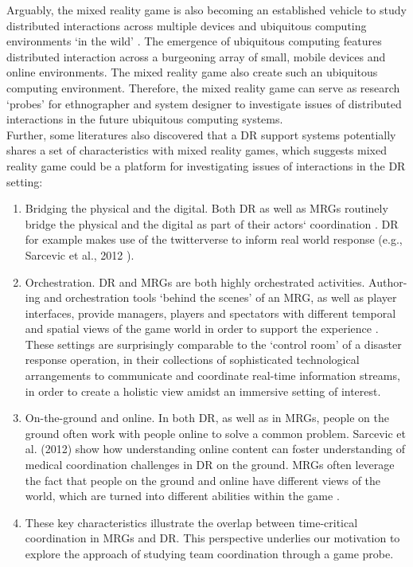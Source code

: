 Arguably, the mixed reality game is also becoming an established vehicle to study distributed interactions across multiple devices and ubiquitous computing environments `in the wild' \cite{Crabtree2006, Benford2005, Fischer2012}. The emergence of ubiquitous computing features distributed interaction across a burgeoning array of small, mobile devices and online environments. The mixed reality game also create such an ubiquitous computing environment. Therefore, the mixed reality game can serve as research `probes' for ethnographer and system designer to investigate issues of distributed interactions in the future ubiquitous computing systems.\\

Further, some literatures \cite{Fischer2012} also discovered that a DR support systems potentially shares a set of characteristics with mixed reality games, which suggests mixed reality game could be a platform for investigating issues of interactions in the DR setting:\\

\begin{enumerate}
\item Bridging the physical and the digital. Both DR as well as MRGs routinely bridge the physical and the digital as part of their actors` coordination \cite{Benford2005}. DR for example makes use of the twitterverse to inform real world response (e.g., Sarcevic et al., 2012 \cite{Sarcevic2012}).

\item Orchestration. DR and MRGs are both highly orchestrated activities. Author-ing and orchestration tools `behind the scenes' of an MRG, as well as player interfaces, provide managers, players and spectators with different temporal and spatial views of the game world in order to support the experience \cite{Crabtree2004}. These settings are surprisingly comparable to the `control room' of a disaster response operation, in their collections of sophisticated technological arrangements to communicate and coordinate real-time information streams, in order to create a holistic view amidst an immersive setting of interest.\\

\item On-the-ground and online. In both DR, as well as in MRGs, people on the ground often work with people online to solve a common problem. Sarcevic et al. (2012)\cite{Sarcevic2012} show how understanding online content can foster understanding of medical coordination challenges in DR on the ground. MRGs often leverage the fact that people on the ground and online have different views of the world, which are turned into different abilities within the game \cite{Flintham2003}.\\ 

\item These key characteristics illustrate the overlap between time-critical coordination in MRGs and DR. This perspective underlies our motivation to explore the approach of studying team coordination through a game probe.\\

\end{enumerate}

